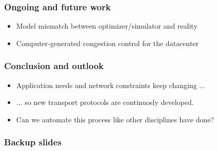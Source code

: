 \documentclass[svgnames]{beamer}
\begin{document}
\begin{Large}
\begin{frame}
\frametitle{Ongoing and future work}
\begin{itemize}
\item<1-> Model mismatch between optimizer/simulator and reality
\item<2-> Computer-generated congestion control for the datacenter
\end{itemize}
\end{frame}

\begin{frame}
\frametitle{Conclusion and outlook}
\begin{itemize}
\item<1-> Application needs and network constraints keep changing ...
\item<2-> ... so new transport protocols are continuosly developed.
\item<3-> Can we automate this process like other disciplines have done?
\end{itemize}
\end{frame}

\end{Large}

\begin{frame}
\frametitle{Backup slides}
\end{frame}


\end{document}
